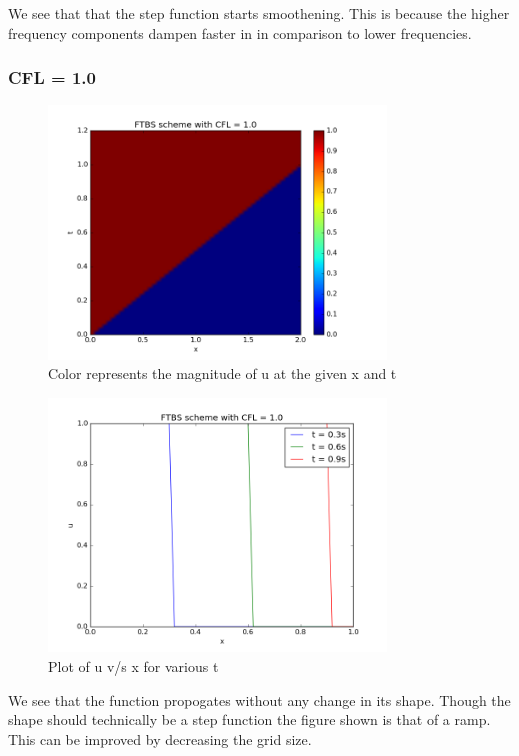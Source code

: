 \documentclass[11pt, a4paper]{article}
\begin{document}
We see that that the step function starts smoothening. This is because the higher frequency components dampen faster in
in comparison to lower frequencies.

\subsubsection{CFL = 1.0}
\begin{figure}[H]
 \centering
 \includegraphics[width = 0.8\textwidth]{FTBS1_1.png}
 \caption{Color represents the magnitude of u at the given x and t}
\end{figure}

\begin{figure}[H]
 \centering
 \includegraphics[width = 0.8\textwidth]{FTBS1_1_1.png}
 \caption{Plot of u v/s x for various t}
\end{figure}

We see that the function propogates without any change in its shape. Though the shape should technically be a step function
the figure shown is that of a ramp. This can be improved by decreasing the grid size.
\end{document}
